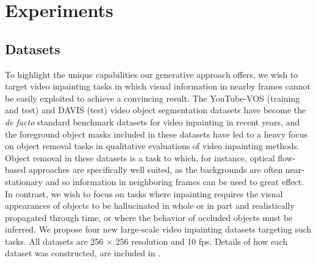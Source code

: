 \chapter{Experiments}
\section{Datasets}
To highlight the unique capabilities our generative approach offers, we wish to target video inpainting tasks in which visual information in nearby frames cannot be easily exploited to achieve a convincing result. The YouTube-VOS \citep{youtubevos1} (training and test) and DAVIS \citep{davis} (test) video object segmentation datasets have become the \emph{de facto} standard benchmark datasets for video inpainting in recent years, and the foreground object masks included in these datasets have led to a heavy focus on object removal tasks in qualitative evaluations of video inpainting methods. Object removal in these datasets is a task to which, for instance, optical flow-based approaches are specifically well suited, as the backgrounds are often near-stationary and so information in neighboring frames can be used to great effect. In contrast, we wish to focus on tasks where inpainting requires the visual appearances of objects to be hallucinated in whole or in part and realistically propagated through time, or where the behavior of occluded objects must be inferred. We propose four new large-scale video inpainting datasets targeting such tasks. All datasets are 256 $\times$ 256 resolution and 10 fps. Details of how each dataset was constructed, are included in .
